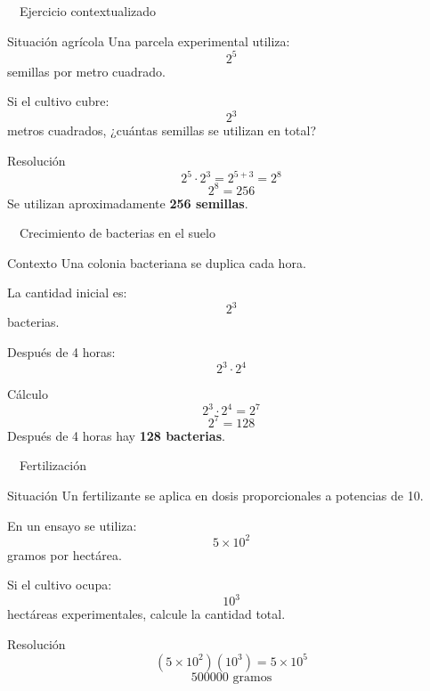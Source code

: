 \documentclass[aspectratio=169,10pt,handout]{beamer}
\newcommand{\iconoAgro}{\faSeedling}
\begin{document}
	\begin{frame}{\iconoAgro\ \ Ejercicio contextualizado}
		\begin{block}{Situación agrícola}
			Una parcela experimental utiliza:
			\[
			2^5
			\]
			semillas por metro cuadrado.
			
			Si el cultivo cubre:
			\[
			2^3
			\]
			metros cuadrados, ¿cuántas semillas se utilizan en total?
		\end{block}
		
		\pause
		
		\begin{exampleblock}{Resolución}
			\[
			2^5 \cdot 2^3 = 2^{5+3} = 2^8
			\]
			\[
			2^8 = 256
			\]
			Se utilizan aproximadamente \textbf{256 semillas}.
		\end{exampleblock}
	\end{frame}
	
	\begin{frame}{\iconoAgro\ \ Crecimiento de bacterias en el suelo}
		\begin{block}{Contexto}
			Una colonia bacteriana se duplica cada hora.
			
			La cantidad inicial es:
			\[
			2^3
			\]
			bacterias.
			
			Después de 4 horas:
			\[
			2^3 \cdot 2^4
			\]
		\end{block}
		
		\pause
		
		\begin{exampleblock}{Cálculo}
			\[
			2^3 \cdot 2^4 = 2^{7}
			\]
			\[
			2^7 = 128
			\]
			Después de 4 horas hay \textbf{128 bacterias}.
		\end{exampleblock}
	\end{frame}
	
	\begin{frame}{\iconoAgro\ \ Fertilización}
		\begin{block}{Situación}
			Un fertilizante se aplica en dosis proporcionales a potencias de 10.
			
			En un ensayo se utiliza:
			\[
			5\times10^2
			\]
			gramos por hectárea.
			
			Si el cultivo ocupa:
			\[
			10^3
			\]
			hectáreas experimentales, calcule la cantidad total.
		\end{block}
		
		\pause
		
		\begin{exampleblock}{Resolución}
			\[
			(5\times10^2)(10^3)=5\times10^{5}
			\]
			\[
			500000\text{ gramos}
			\]
		\end{exampleblock}
	\end{frame}
	
\end{document}
